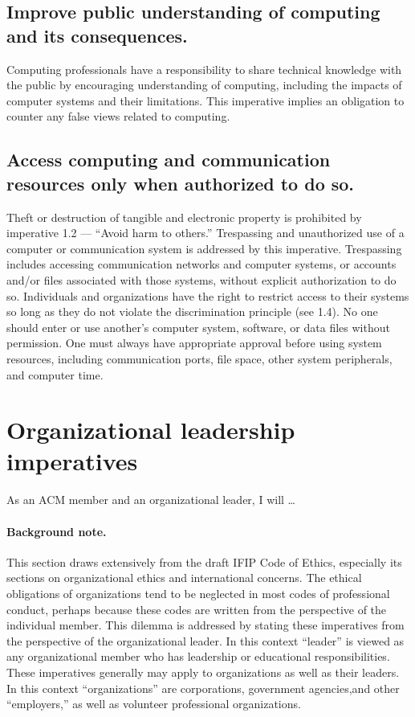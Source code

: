 \documentclass{article}
\begin{document}
\subsection{Improve public understanding of computing and its consequences.}

Computing professionals have a responsibility to share technical knowledge with
the public by encouraging understanding of computing, including the impacts of
computer systems and their limitations. This imperative implies an obligation
to counter any false views related to computing.

\subsection{Access computing and communication resources only when authorized
to do so.}

Theft or destruction of tangible and electronic property is prohibited by
imperative 1.2 --- ``Avoid harm to others.'' Trespassing and unauthorized use
of a computer or communication system is addressed by this imperative.
Trespassing includes accessing communication networks and computer systems, or
accounts and/or files associated with those systems, without explicit
authorization to do so. Individuals and organizations have the right to
restrict access to their systems so long as they do not violate the
discrimination principle (see 1.4). No one should enter or use another's
computer system, software, or data files without permission. One must always
have appropriate approval before using system resources, including
communication ports, file space, other system peripherals, and computer time.

\section{Organizational leadership imperatives}

As an ACM member and an organizational leader, I will \ldots

\paragraph{Background note.} This section draws extensively from the draft IFIP
Code of Ethics, especially its sections on organizational ethics and
international concerns. The ethical obligations of organizations tend to be
neglected in most codes of professional conduct, perhaps because these codes
are written from the perspective of the individual member. This dilemma is
addressed by stating these imperatives from the perspective of the
organizational leader. In this context ``leader'' is viewed as any
organizational member who has leadership or educational responsibilities. These
imperatives generally may apply to organizations as well as their leaders. In
this context ``organizations'' are corporations, government agencies,and other
``employers,'' as well as volunteer professional organizations.
\end{document}
